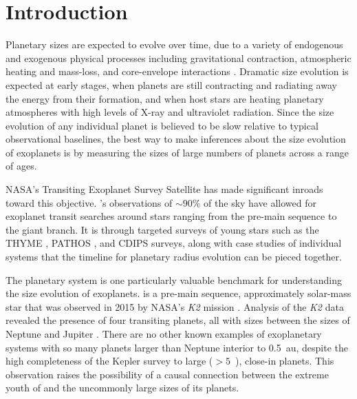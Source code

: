 \documentclass[twocolumn]{aastex631}
\begin{document}



\section{Introduction} \label{sec:intro}
Planetary sizes are expected to evolve over time, due to a variety of endogenous and exogenous physical processes including gravitational contraction, atmospheric heating and mass-loss, and core-envelope interactions \citep[e.g.][]{OwenWu2013, Lopez2013, Jin2014, ChenRogers2016, Ginzburg2018}. Dramatic size evolution is expected at early stages, when planets are still contracting and radiating away the energy from their formation, and when host stars are heating planetary atmospheres with high levels of X-ray and ultraviolet radiation. Since the size evolution of any individual planet is believed to be slow relative to typical observational baselines, the best way to make inferences about the size evolution of exoplanets is by measuring the sizes of large numbers of planets across a range of ages. 

NASA's Transiting Exoplanet Survey Satellite \citep[TESS,][]{Ricker2015} has made significant inroads toward this objective. \tess's observations of $\sim 90 \%$ of the sky have allowed for exoplanet transit searches around stars ranging from the pre-main sequence to the giant branch. It is through targeted surveys of young stars such as the THYME \citep[e.g.][]{Newton2019}, PATHOS \citep[e.g.][]{Nardiello2020}, and CDIPS \citep[e.g.][]{Bouma2020} surveys, along with case studies of individual systems \citep[e.g.][]{benatti19, Plavchan2020, Hedges2021, Zhou2021} that the timeline for planetary radius evolution can be pieced together. 

The \sname planetary system is one particularly valuable benchmark for understanding the size evolution of exoplanets. \sname is a pre-main sequence, approximately solar-mass star that was observed in 2015 by NASA's \textit{K2} mission \citep{Howell2014}. Analysis of the \textit{K2} data revealed the presence of four transiting planets, all with sizes between the sizes of Neptune and Jupiter \citep{David2019a, David2019b}. There are no other known examples of exoplanetary systems with so many planets larger than Neptune interior to 0.5~au, despite the high completeness of the Kepler survey to large ($>5$~\rearth), close-in planets. This observation raises the possibility of a causal connection between the extreme youth of \sname and the uncommonly large sizes of its planets.  
\end{document}
